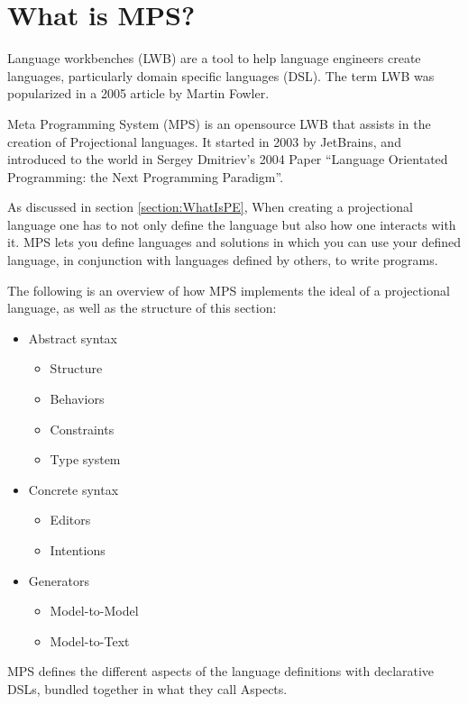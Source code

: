 \section{What is MPS?}
\label{section:MPS}

Language workbenches (LWB) are a tool to help language engineers create languages, particularly domain specific languages (DSL).
The term LWB was popularized in a 2005 article by Martin Fowler\cite{Fowler_lwb}.

Meta Programming System (MPS) is an opensource LWB that assists in the creation of Projectional languages.
It started in 2003 by JetBrains, and introduced to the world in Sergey Dmitriev's 2004 Paper ``Language Orientated Programming: the Next Programming Paradigm''\cite{dmitriev2004language}.

As discussed in section \ref{section:WhatIsPE}, When creating a projectional language one has to not only define the language but also how one interacts with it.
MPS lets you define languages and solutions in which you can use your defined language, in conjunction with languages defined by others, to write programs.

The following is an overview of how MPS implements the ideal of a projectional language, as well as the structure of this section: 

\begin{itemize}
    \item Abstract syntax
    \begin{itemize}
        \item Structure
        \item Behaviors
        \item Constraints
        \item Type system
    \end{itemize}
    \item Concrete syntax
    \begin{itemize}
        \item Editors
        \item Intentions
    \end{itemize}
    \item Generators
    \begin{itemize}
        \item Model-to-Model
        \item Model-to-Text
    \end{itemize}
\end{itemize}

MPS defines the different aspects of the language definitions with declarative DSLs, bundled together in what they call Aspects.

